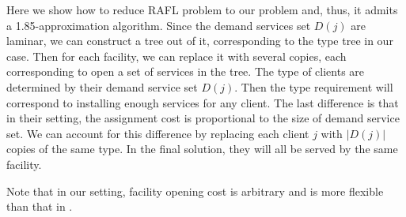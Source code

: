 Here we show how to reduce RAFL problem to our problem and, thus, it admits a 1.85-approximation algorithm. Since the demand services set $D(j)$ are laminar, we can construct a tree out of it, corresponding to the type tree in our case. Then for each facility, we can replace it with several copies, each corresponding to open a set of services in the tree. The type of clients are determined by their demand service set $D(j)$. Then the type requirement will correspond to installing enough services for any client. The last difference is that in their setting, the assignment cost is proportional to the size of demand service set. We can account for this difference by replacing each client $j$ with $|D(j)|$ copies of the same type. In the final solution, they will all be served by the same facility.

Note that in our setting, facility opening cost is arbitrary and is more flexible than that in \cite{DBLP:journals/corr/abs-1110-4150}.
